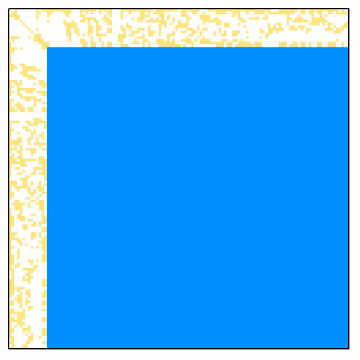 \begin{figure}[ht!]
	\centering
	\begin{subfigure}[t]{0.45\textwidth}
		\centering
		\includegraphics[width=\textwidth, keepaspectratio]{images/ch03/input-matrices/decomposition-benchmarks/msc10848_icmxpp_nan.pdf}
		\label{Figure:comparing-decomposers-and-solvers->decomposition-project-benchmarks->decomposers-benchmark->accuracy-of-results-on-all-matrices->double-precision->matrix-with-metrics->ICMxPP-with-nan-results->msc10848->nonzero-element-pattern}
	\end{subfigure}\hspace{0.03\textwidth}
	\begin{subfigure}[t]{0.51\textwidth}
		\centering

\end{subfigure}
\end{figure}

